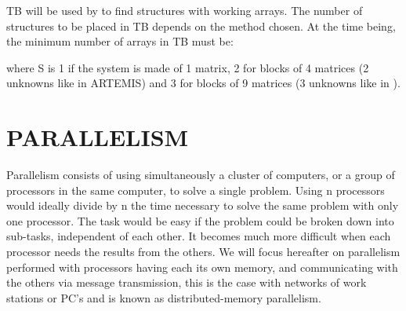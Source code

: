TB will be used by  to find  structures with
working arrays. The number of structures to be placed in TB depends on the
method chosen. At the time being, the minimum number of arrays in TB must be:

 where S is 1 if the system is made of 1
  matrix, 2 for blocks of 4 matrices (2 unknowns like in ARTEMIS) and 3 for
  blocks of 9 matrices (3 unknowns like in ).

\section{PARALLELISM}

Parallelism consists of using simultaneously a cluster of computers, or a group
of processors in the same computer, to solve a single problem. Using n
processors would ideally divide by n the time necessary to solve the same
problem with only one processor. The task would be easy if the problem could be
broken down into sub-tasks, independent of each other. It becomes much more
difficult when each processor needs the results from the others. We will focus
hereafter on parallelism performed with processors having each its own memory,
and communicating with the others via message transmission, this is the case
with networks of work stations or PC's and is known as distributed-memory
parallelism.


